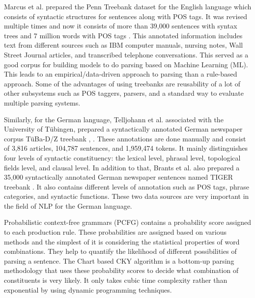 \documentclass[a4paper, 11pt]{article}
\begin{document}

Marcus et al.\parencite{Marcus1993} prepared the Penn Treebank dataset for the English language which consists of syntactic structures for sentences along with POS tags. It was revised multiple times and now it consists of more than 39,000 sentences with syntax trees and 7 million words with POS tags \parencite{Taylor2003}. This annotated information includes text from different sources such as IBM computer manuals, nursing notes, Wall Street Journal articles, and transcribed telephone conversations. This served as a good corpus for building models to do parsing based on Machine Learning (ML). This leads to an empirical/data-driven approach to parsing than a rule-based approach. Some of the advantages of using treebanks are reusability of a lot of other subsystems such as POS taggers, parsers, and a standard way to evaluate multiple parsing systems. 

Similarly, for the German language, Telljohann et al. associated with the University of Tübingen, prepared a syntactically annotated German newspaper corpus TüBa-D/Z treebank \parencite{TubingenTreebank}, \parencite{Telljohann04thetuba}. These annotations are done manually and consist of 3,816 articles, 104,787 sentences, and 1,959,474 tokens. It mainly distinguishes four levels of syntactic constituency: the lexical level, phrasal level, topological fields level, and clausal level. In addition to that, Brants et al. also prepared a 35,000 syntactically annotated German newspaper sentences named TIGER treebank \parencite{Brants2002TheTT}. It also contains different levels of annotation such as POS tags, phrase categories, and syntactic functions. These two data sources are very important in the field of NLP for the German language. 


Probabilistic context-free grammars (PCFG) \parencite{4569603} contains a probability score assigned to each production rule. These probabilities are assigned based on various methods and the simplest of it is considering the statistical properties of word combinations. They help to quantify the likelihood of different possibilities of parsing a sentence. The Chart based CKY \parencite{YOUNGER1967189} algorithm is a bottom-up parsing methodology that uses these probability scores to decide what combination of constituents is very likely. It only takes cubic time complexity rather than exponential by using dynamic programming techniques. 
\end{document}
